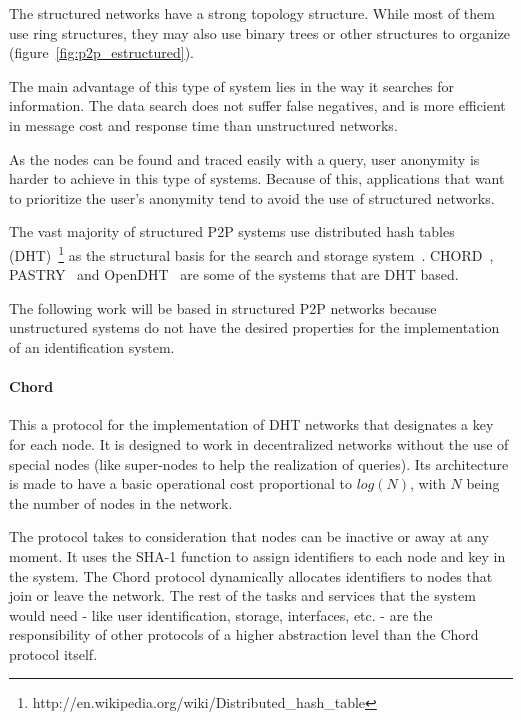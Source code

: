 The structured networks have a strong topology structure. While most of them
use ring structures, they may also use binary trees or other
structures to organize (figure~\ref{fig:p2p_estructured}).

The main advantage of this type of system lies in the way it searches for
information. The data search does not
suffer false negatives, and is more efficient in message cost and response
time than unstructured networks. 

As the nodes can be found and traced easily with a query, user anonymity is harder to
achieve in this type of systems. Because of this, applications that want to
prioritize the user's anonymity tend to avoid the use of structured networks.

The vast majority of structured P2P systems use distributed hash tables
(DHT)~\footnote{http://en.wikipedia.org/wiki/Distributed\_hash\_table} as
the structural basis for the search and storage system~\cite{BalakrishnanEtAl03}.
CHORD~\cite{conf:hotos:DabekBKKMSB01},
PASTRY~\cite{oai:CiteSeerPSU:441779} and 
OpenDHT~\cite{Rhea:2005:OPD:1080091.1080102}
are some of the systems that are DHT based.

The following work will be based in structured P2P networks because unstructured
systems do not have the desired properties for the implementation of an
identification system. 

\paragraph{Chord}
\label{sec:chord}

This a protocol for the implementation of DHT networks that designates a key
for each node. It is designed to work in decentralized networks without the use of
special nodes (like super-nodes to help the realization of queries). Its 
architecture is made to have a basic operational cost proportional to $log(N)$,
with $N$ being the number of nodes in the network.

The protocol takes to consideration that nodes can be inactive or away at any
moment. It uses the SHA-1 function to assign identifiers to each node
and key in the system. The Chord protocol dynamically allocates identifiers to nodes that
join or leave the network. The rest of the tasks and services that the system
would need - like user identification, storage, interfaces, etc. - are the
responsibility of other protocols of a higher abstraction level than the
Chord protocol itself.

